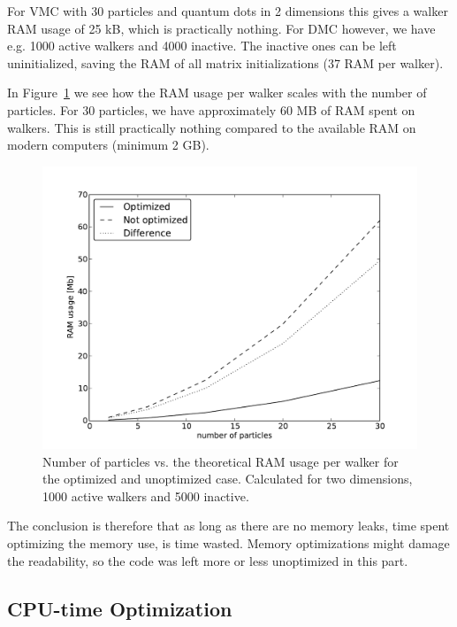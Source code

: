 For VMC with 30 particles and quantum dots in 2 dimensions this gives a walker RAM usage of 25 kB, which is practically nothing. For DMC however, we have e.g. 1000 active walkers and 4000 inactive. The inactive ones can be left uninitialized, saving the RAM of all matrix initializations (37 RAM per walker). 

In Figure~\ref{FIG:RAMusagePrWalker} we see how the RAM usage per walker scales with the number of particles. For 30 particles, we have approximately 60 MB of RAM spent on walkers. This is still practically nothing compared to the available RAM on modern computers (minimum 2 GB).

\begin{figure}
\label{FIG:RAMusagePrWalker}
 \begin{center}
  \includegraphics[scale=0.75]{../Graphics/RAMusagePrWalker.pdf}
  \caption{Number of particles vs. the theoretical RAM usage per walker for the optimized and unoptimized case. Calculated for two dimensions, 1000 active walkers and 5000 inactive.}
 \end{center}
\end{figure}

The conclusion is therefore that as long as there are no memory leaks, time spent optimizing the memory use, is time wasted. Memory optimizations might damage the readability, so the code was left more or less unoptimized in this part.

\subsection{CPU-time Optimization}

